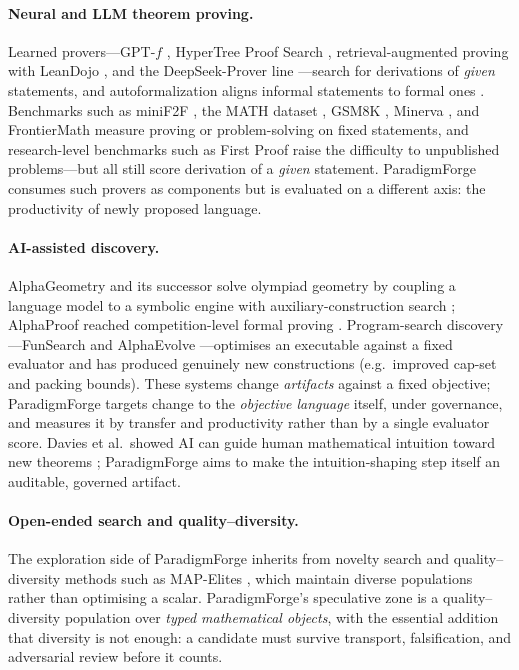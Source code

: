 \documentclass[11pt]{article}
\theoremstyle{definition}
\theoremstyle{remark}
\newcommand{\PF}{ParadigmForge}
\begin{document}
\paragraph{Neural and LLM theorem proving.}
Learned provers---GPT-$f$ \citep{polu2020}, HyperTree Proof Search \citep{lample2022htps},
retrieval-augmented proving with LeanDojo \citep{yang2023leandojo}, and the DeepSeek-Prover line
\citep{xin2024dsprover,xin2024dsproverv15}---search for derivations of \emph{given} statements, and
autoformalization aligns informal statements to formal ones \citep{wu2022autoform,jiang2023dsp}.
Benchmarks such as miniF2F \citep{zheng2022minif2f}, the MATH dataset \citep{hendrycks2021math},
GSM8K \citep{cobbe2021gsm8k}, Minerva \citep{lewkowycz2022minerva}, and FrontierMath
\citep{glazer2024frontiermath} measure proving or problem-solving on fixed statements, and
research-level benchmarks such as First Proof \citep{abouzaid2026firstproof} raise the difficulty to
unpublished problems---but all still score derivation of a \emph{given} statement. \PF{} consumes
such provers as components but is evaluated on a different axis: the productivity of newly proposed
language.

\paragraph{AI-assisted discovery.}
AlphaGeometry and its successor solve olympiad geometry by coupling a language model to a symbolic
engine with auxiliary-construction search \citep{trinh2024alphageom,chervonyi2025alphageom2};
AlphaProof reached competition-level formal proving \citep{deepmind2024alphaproof}. Program-search
discovery---FunSearch \citep{romera2024funsearch} and AlphaEvolve
\citep{deepmind2025alphaevolve}---optimises an executable against a fixed evaluator and has produced
genuinely new constructions (e.g.\ improved cap-set and packing bounds). These systems change
\emph{artifacts} against a fixed objective; \PF{} targets change to the \emph{objective language}
itself, under governance, and measures it by transfer and productivity rather than by a single
evaluator score. Davies et al.\ showed AI can guide human mathematical intuition toward new theorems
\citep{davies2021}; \PF{} aims to make the intuition-shaping step itself an auditable, governed
artifact.

\paragraph{Open-ended search and quality--diversity.}
The exploration side of \PF{} inherits from novelty search \citep{lehman2011novelty} and
quality--diversity methods such as MAP-Elites \citep{mouret2015mapelites,cully2015}, which maintain
diverse populations rather than optimising a scalar. \PF{}'s speculative zone is a quality--diversity
population over \emph{typed mathematical objects}, with the essential addition that diversity is not
enough: a candidate must survive transport, falsification, and adversarial review before it counts.
\end{document}
